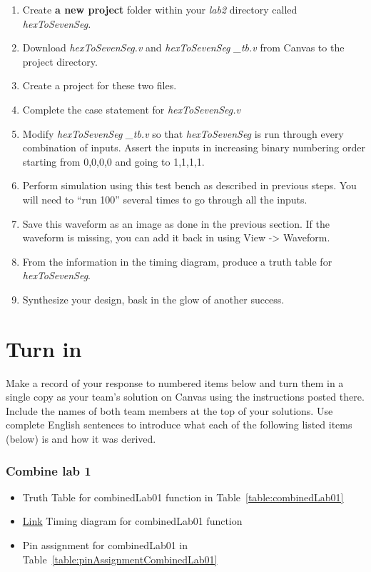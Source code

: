 \begin{enumerate}
\item
  Create \textbf{a new project} folder within your \emph{lab2} directory
  called \emph{hexToSevenSeg.}
\item
  Download \emph{hexToSevenSeg.v} and \emph{hexToSevenSeg \_tb.v} from
  Canvas to the project directory.
\item
  Create a project for these two files.
\item
  \protect\hypertarget{Hex2Seven_Verilog}{}{}Complete the case statement
  for \emph{hexToSevenSeg.v}
\item
  Modify \emph{hexToSevenSeg \_tb.v} so that \emph{hexToSevenSeg} is run
  through every combination of inputs. Assert the inputs in increasing
  binary numbering order starting from 0,0,0,0 and going to 1,1,1,1.
\item
  Perform simulation using this test bench as described in previous
  steps. You will need to ``run 100'' several times to go through all
  the inputs.
\item
  \protect\hypertarget{Hex2Seven_Waveform}{}{}Save this waveform as an
  image as done in the previous section. If the waveform is missing, you
  can add it back in using View -\textgreater{} Waveform.
\item
  From the information in the timing diagram, produce a truth table for
  \emph{hexToSevenSeg}.
\item
  Synthesize your design, bask in the glow of another success.
\end{enumerate}

\section{Turn in}

Make a record of your response to numbered items below and turn them in
a single copy as your team's solution on Canvas using the instructions
posted there. Include the names of both team members at the top of your
solutions. Use complete English sentences to introduce what each of the
following listed items (below) is and how it was derived.

\subsubsection{Combine lab 1} 
\begin{itemize}
\item Truth Table for combinedLab01 function in Table~\ref{table:combinedLab01}
\item \protect\hyperlink{CombinedLab01_Waveform}{Link} Timing diagram for combinedLab01 function
\item  Pin assignment for combinedLab01 in Table~\ref{table:pinAssignmentCombinedLab01}
\end{itemize}


